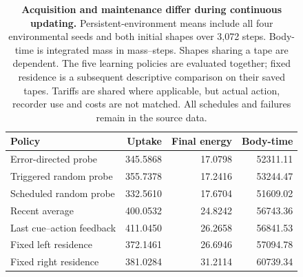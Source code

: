 \begin{table}[htbp]
\centering\small
\begin{tabular}{lrrr}
\toprule
Policy & Uptake & Final energy & Body-time\\
\midrule
Error-directed probe &345.5868&17.0798&52311.11\\
Triggered random probe &355.7378&17.2416&53244.47\\
Scheduled random probe &332.5610&17.6704&51609.02\\
Recent average &400.0532&24.8242&56743.36\\
Last cue--action feedback &411.0450&26.2658&56841.53\\
Fixed left residence &372.1461&26.6946&57094.78\\
Fixed right residence &381.0284&31.2114&60739.34\\
\bottomrule
\end{tabular}
\caption{\textbf{Acquisition and maintenance differ during continuous updating.}
Persistent-environment means include all four environmental seeds and both initial shapes over 3,072 steps. Body-time is integrated mass in mass--steps. Shapes sharing a tape are dependent. The five learning policies are evaluated together; fixed residence is a subsequent descriptive comparison on their saved tapes. Tariffs are shared where applicable, but actual action, recorder use and costs are not matched. All schedules and failures remain in the source data.}
\label{tab:continuous}
\end{table}
